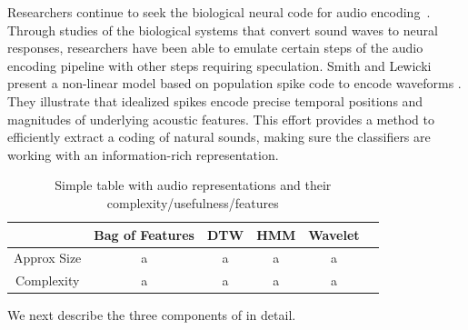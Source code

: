 Researchers continue to seek the biological neural code for audio
encoding~\cite{Eggermont2001}. 
Through studies of the biological systems that convert sound waves to neural
responses, researchers have been able to emulate certain steps of the audio
encoding pipeline with other steps requiring speculation. 
Smith and Lewicki present a non-linear model based on population spike code 
to encode waveforms \cite{smith-efficient-2006}. 
They illustrate that idealized spikes encode precise temporal positions and
magnitudes of underlying acoustic features. 
This effort provides a method to efficiently extract a coding of natural 
sounds, making sure the classifiers are working with an information-rich
representation.

\begin{table}[t]
    \centering
    \begin{tabular}{cccccc}
                & Bag of Features & DTW & HMM & Wavelet  \\ \hline
    Approx Size & a & a & a & a \\
    Complexity  & a & a & a & a
    \end{tabular}
    \caption{Simple table with audio representations and their complexity/usefulness/features}
    \label{tab:audioreps}
\end{table}

We next describe the three components of \sys in detail.
